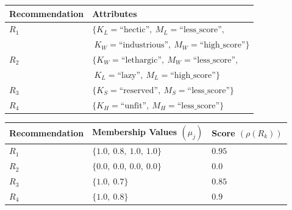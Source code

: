 \documentclass[conference]{IEEEtran}
\newcommand{\quotes}[1]{``#1''}
\begin{document}
\begin{table}
\small
{}
\begin{center}
\def\arraystretch{1.7}
\begin{tabular}{| l | l |}
\hline
\bf Recommendation & \bf Attributes \\
\hline
$R_1$ & $\{K_L = \text{\quotes{hectic}},\ M_L = \text{\quotes{less\_score}},$\\&$\ K_W=\text{\quotes{industrious}},\ M_W=\text{\quotes{high\_score}}\}$ \\
\hline
$R_2$ & $\{K_W = \text{\quotes{lethargic}},\ M_W = \text{\quotes{less\_score}},$\\& $\ K_L=\text{\quotes{lazy}},\ M_L=\text{\quotes{high\_score}}\}$ \\
\hline
$R_3$ & $\{K_S = \text{\quotes{reserved}},\ M_S = \text{\quotes{less\_score}}\}$ \\
\hline
$R_4$ & $\{K_H = \text{\quotes{unfit}},\ M_H = \text{\quotes{less\_score}}\}$ \\
\hline
\end{tabular}
\end{center}
\vspace{-1em}
\end{table}
\begin{table}
\small
{}
\begin{center}
\def\arraystretch{1.7}
\begin{tabular}{| l | l | l |}
\hline
\bf Recommendation & \bf Membership Values $(\mu_{j})$ & \bf Score $(\rho(R_k))$ \\
\hline
$R_1$ & $\{1.0,\ 0.8,\ 1.0,\ 1.0\}$ & $0.95$ \\
\hline
$R_2$ & $\{0.0,\ 0.0,\ 0.0,\ 0.0\}$ & $0.0$ \\
\hline
$R_3$ & $\{1.0,\ 0.7\}$ & $0.85$ \\
\hline
$R_4$ & $\{1.0,\ 0.8\}$ & $0.9$ \\
\hline
\end{tabular}
\end{center}
\end{table}

\end{document}
